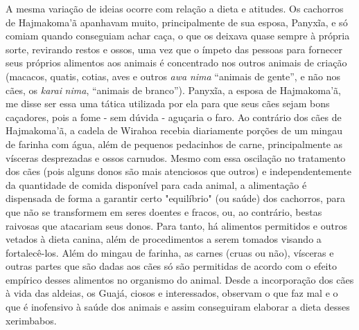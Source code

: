 A mesma variação de ideias ocorre com relação a dieta e atitudes. Os
cachorros de Hajmakoma'ã apanhavam muito, principalmente de sua esposa,
Panyxĩa, e só comiam quando conseguiam achar caça, o que os deixava
quase sempre à própria sorte, revirando restos e ossos, uma vez que o
ímpeto das pessoas para fornecer seus próprios alimentos aos animais é
concentrado nos outros animais de criação (macacos, quatis, cotias, aves
e outros \emph{awa} \emph{nima} ``animais de gente'', e não nos cães, os
\emph{karai} \emph{nima}, ``animais de branco''). Panyxĩa, a esposa de
Hajmakoma'ã, me disse ser essa uma tática utilizada por ela para que
seus cães sejam bons caçadores, pois a fome - sem dúvida - aguçaria o
faro. Ao contrário dos cães de Hajmakoma'ã, a cadela de Wirahoa recebia
diariamente porções de um mingau de farinha com água, além de pequenos
pedacinhos de carne, principalmente as vísceras desprezadas e ossos
carnudos. Mesmo com essa oscilação no tratamento dos cães (pois alguns
donos são mais atenciosos que outros) e independentemente da quantidade
de comida disponível para cada animal, a alimentação é dispensada de
forma a garantir certo "equilíbrio" (ou saúde) dos cachorros, para que
não se transformem em seres doentes e fracos, ou, ao contrário, bestas
raivosas que atacariam seus donos. Para tanto, há alimentos permitidos e
outros vetados à dieta canina, além de procedimentos a serem tomados
visando a fortalecê-los. Além do mingau de farinha, as carnes (cruas ou
não), vísceras e outras partes que são dadas aos cães só são permitidas
de acordo com o efeito empírico desses alimentos no organismo do animal.
Desde a incorporação dos cães à vida das aldeias, os Guajá, ciosos e
interessados, observam o que faz mal e o que é inofensivo à saúde dos
animais e assim conseguiram elaborar a dieta desses xerimbabos.

